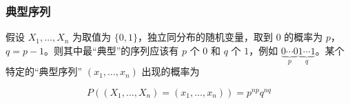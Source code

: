\documentclass{beamer}
\begin{document}
\begin{frame}
    \frametitle{典型序列}

    假设 $X_1, \dots, X_n$ 为取值为 $\{0, 1\}$，独立同分布的随机变量，取到 $0$ 的概率为 $p$，$q = p - 1$。则其中最``典型''的序列应该有 $p$ 个 $0$ 和 $q$ 个 $1$，例如 $\underbrace{0\cdots 0}_{p} \underbrace{1\cdots 1}_{q}$。某个特定的``典型序列'' $(x_1, \dots, x_n)$ 出现的概率为

    \[P((X_1, \dots, X_n) = (x_1, \dots, x_n)) = p^{np} q^{nq}\]

\end{frame}
\end{document}
